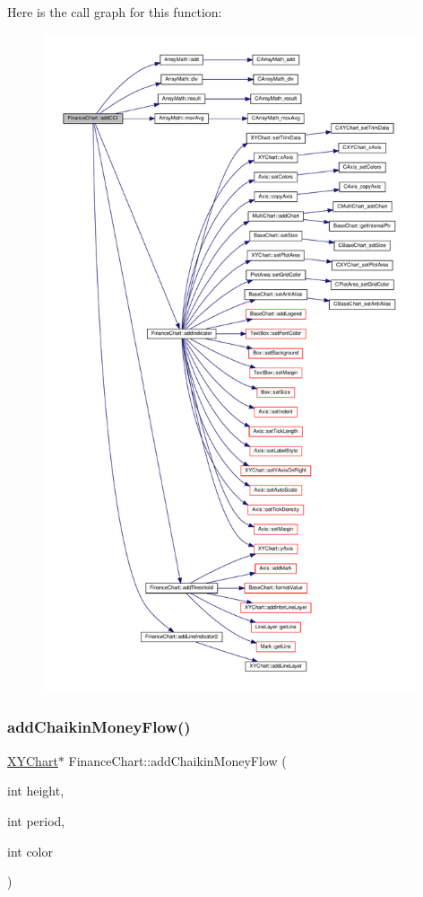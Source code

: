 Here is the call graph for this function\+:
\nopagebreak
\begin{figure}[H]
\begin{center}
\leavevmode
\includegraphics[height=550pt]{class_finance_chart_a1841d99b6f71cafd6207f18a57d5b5d7_cgraph}
\end{center}
\end{figure}
\mbox{\label{class_finance_chart_a1f09c095f7013a3e8d9e6d97009e1d26}} 
\subsubsection{\texorpdfstring{add\+Chaikin\+Money\+Flow()}{addChaikinMoneyFlow()}}
{\footnotesize\ttfamily \hyperlink{class_x_y_chart}{X\+Y\+Chart}$\ast$ Finance\+Chart\+::add\+Chaikin\+Money\+Flow (\begin{DoxyParamCaption}\item[{int}]{height,  }\item[{int}]{period,  }\item[{int}]{color }\end{DoxyParamCaption})\hspace{0.3cm}{\ttfamily [inline]}}



